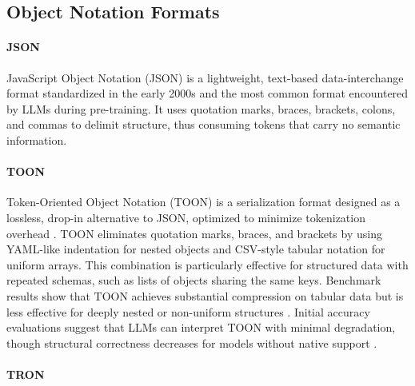 \documentclass[11pt]{article}
\begin{document}
\subsection{Object Notation Formats}

\paragraph{JSON}


JavaScript Object Notation (JSON) is a lightweight, text-based data-interchange format standardized in the early 2000s \citep{Bourhis_Reutter_Suárez_Vrgoč_2017} and the most common format encountered by LLMs during pre-training. It uses quotation marks, braces, brackets, colons, and commas to delimit structure, thus consuming tokens that carry no semantic information.

\paragraph{TOON}

Token-Oriented Object Notation (TOON) is a serialization format designed as a lossless, drop-in alternative to JSON, optimized to minimize tokenization overhead \citep{toon-format/toon_2026, Lafalce_2025}. TOON eliminates quotation marks, braces, and brackets by using YAML-like indentation for nested objects and CSV-style tabular notation for uniform arrays. This combination is particularly effective for structured data with repeated schemas, such as lists of objects sharing the same keys. Benchmark results show that TOON achieves substantial compression on tabular data but is less effective for deeply nested or non-uniform structures \citep{Lafalce_2025}. Initial accuracy evaluations suggest that LLMs can interpret TOON with minimal degradation, though structural correctness decreases for models without native support \citep{Masciari_Moscato_Napolitano_Orlando_Perillo_Russo_2026}.

\paragraph{TRON}
\end{document}
